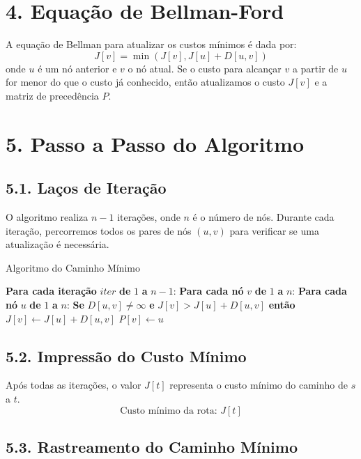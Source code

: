 \documentclass{article}
\begin{document}
\section*{4. Equação de Bellman-Ford}
A equação de Bellman para atualizar os custos mínimos é dada por:
\[
J[v] = \min \left( J[v], J[u] + D[u,v] \right)
\]
onde \( u \) é um nó anterior e \( v \) o nó atual. Se o custo para alcançar \( v \) a partir de \( u \) for menor do que o custo já conhecido, então atualizamos o custo \( J[v] \) e a matriz de precedência \( P \).

\section*{5. Passo a Passo do Algoritmo}

\subsection*{5.1. Laços de Iteração}
O algoritmo realiza \( n-1 \) iterações, onde \( n \) é o número de nós. Durante cada iteração, percorremos todos os pares de nós \( (u, v) \) para verificar se uma atualização é necessária.

\begin{algorithm}
\caption{Algoritmo do Caminho Mínimo}
\begin{algorithmic}
\STATE \textbf{Para cada iteração } $iter$ \textbf{ de } $1$ \textbf{ a } $n-1$:
\STATE \quad \textbf{Para cada nó } $v$ \textbf{ de } $1$ \textbf{ a } $n$:
\STATE \quad \quad \textbf{Para cada nó } $u$ \textbf{ de } $1$ \textbf{ a } $n$:
\STATE \quad \quad \quad \textbf{Se } $D[u, v] \neq \infty$ \textbf{ e } $J[v] > J[u] + D[u, v]$ \textbf{ então }
\STATE \quad \quad \quad \quad $J[v] \leftarrow J[u] + D[u, v]$
\STATE \quad \quad \quad \quad $P[v] \leftarrow u$
\end{algorithmic}
\end{algorithm}

\subsection*{5.2. Impressão do Custo Mínimo}
Após todas as iterações, o valor \( J[t] \) representa o custo mínimo do caminho de \( s \) a \( t \).
\[
\text{Custo mínimo da rota: } J[t]
\]

\subsection*{5.3. Rastreamento do Caminho Mínimo}
\end{document}
